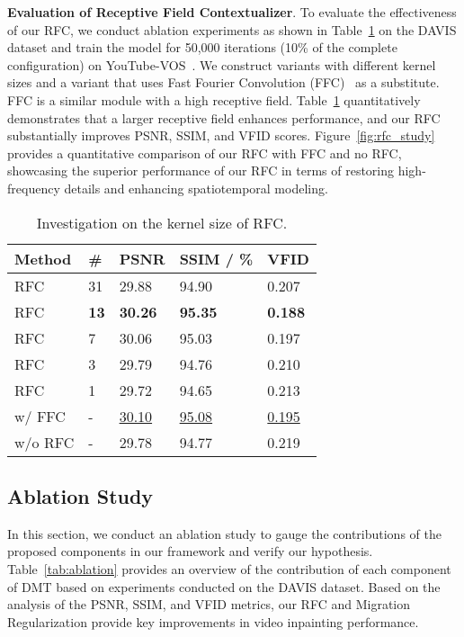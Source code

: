 \documentclass[10pt,twocolumn,letterpaper]{article}
\begin{document}
\noindent
\textbf{Evaluation of Receptive Field Contextualizer}. To evaluate the effectiveness of our RFC, we conduct ablation experiments as shown in Table~\ref{tab:abla_largeks} on the DAVIS dataset and train the model for 50,000 iterations (10\% of the complete configuration) on YouTube-VOS~\cite{youtubevos}. We construct variants with different kernel sizes  and a variant that uses Fast Fourier Convolution (FFC)~\cite{suvorov22lama} as a substitute. FFC is a similar module with a high receptive field. Table~\ref{tab:abla_largeks} quantitatively demonstrates that a larger receptive field enhances performance, and our RFC substantially improves PSNR, SSIM, and VFID scores. Figure~\ref{fig:rfc_study} provides a quantitative comparison of our RFC with FFC and no RFC, showcasing the superior performance of our RFC in terms of restoring high-frequency details and enhancing spatiotemporal modeling. 

\begin{table}[t]
\centering
\small
\caption{Investigation on the kernel size  of RFC.}
\label{tab:abla_largeks}
\begin{tabular}{ll|lll}\toprule \rowcolor{TableHead}
Method & \#  & PSNR & SSIM / \% & VFID  \\ \midrule \rowcolor{RowColor}
RFC    & 31  & 29.88 & 94.90 & 0.207 \\\rowcolor{RowColor}
RFC    & \textbf{13}  & \textbf{30.26}\textcolor{yyellow}{} & \textbf{95.35}\textcolor{yyellow}{} & \textbf{0.188}\textcolor{yyellow}{} \\ \rowcolor{RowColor}
RFC    & 7   & 30.06 & 95.03 & 0.197 \\ \rowcolor{RowColor}
RFC    & 3   & 29.79 & 94.76 & 0.210 \\ \rowcolor{RowColor}
RFC    & 1   & 29.72 & 94.65 & 0.213 \\ \midrule
w/ FFC~\cite{suvorov22lama}    & -   & \underline{30.10} & \underline{95.08} & \underline{0.195} \\
w/o RFC & - & 29.78 & 94.77 & 0.219 \\  \bottomrule
\end{tabular}
\end{table} 


\subsection{Ablation Study}

In this section, we conduct an ablation study to gauge the contributions of the proposed components in our framework and verify our hypothesis. Table~\ref{tab:ablation} provides an overview of the contribution of each component of DMT based on experiments conducted on the DAVIS dataset. Based on the analysis of the PSNR, SSIM, and VFID metrics, our RFC and Migration Regularization provide key improvements in video inpainting performance.
\end{document}
